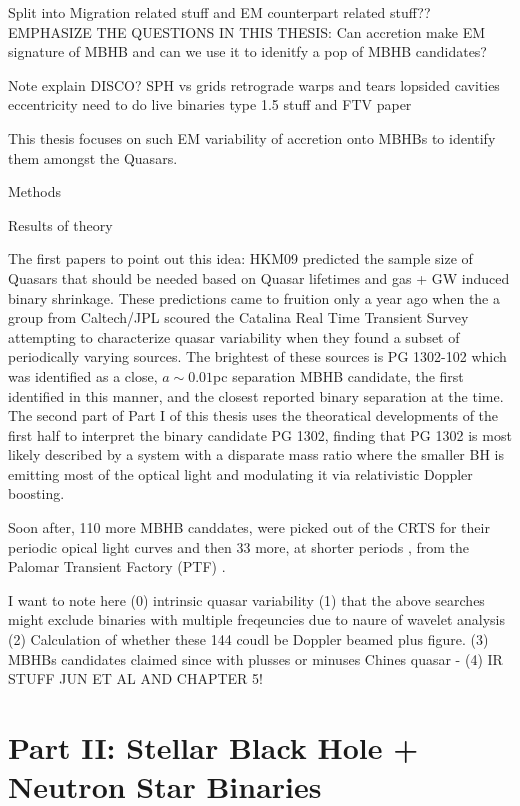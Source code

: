 {Split into Migration related stuff and EM counterpart related stuff??
EMPHASIZE THE QUESTIONS IN THIS THESIS: Can accretion make EM signature of MBHB and can we use it to idenitfy a pop of MBHB candidates?

Note
explain DISCO?
SPH vs grids
retrograde
warps and tears
lopsided cavities
eccentricity
need to do live binaries type 1.5 stuff and FTV paper





This thesis focuses on such EM variability of accretion onto MBHBs to identify
them amongst the Quasars.

Methods

Results of theory

The first papers to point out this idea: HKM09 predicted the sample size of
Quasars that should be needed based on Quasar lifetimes and gas + GW induced
binary shrinkage. These predictions came to fruition only a year ago when the
a group from Caltech/JPL scoured the Catalina Real Time Transient Survey
\citep{CRTS refs} attempting to characterize quasar variability when they
found a subset of periodically varying sources. The brightest of these sources
is PG 1302-102 which was identified as a close, $a \sim 0.01$pc separation
MBHB candidate, the first identified in this manner, and the closest reported
binary separation at the time. The second part of Part I of this thesis uses
the theoratical developments of the first half to interpret the binary
candidate PG 1302, finding that PG 1302 is most likely described by a system
with a disparate mass ratio where the smaller BH is emitting most of the
optical light and modulating it via relativistic Doppler boosting.


Soon after, 110 more MBHB canddates, were picked out of the CRTS for
their periodic opical light curves \citep{Graham:2015b} and then 33 more, at
shorter periods \citep{CharisiMBHBs:2016}, from the Palomar Transient Factory
(PTF) \citep{}.

I want to note here 
(0) intrinsic quasar variability
(1) that the above searches might exclude binaries with multiple freqeuncies due to naure of wavelet analysis
(2) Calculation of whether these 144 coudl be Doppler beamed plus figure.
(3) MBHBs candidates claimed since with plusses or minuses
	Chines quasar - 
(4) IR STUFF JUN ET AL AND CHAPTER 5!






\section{Part II: Stellar Black Hole + Neutron Star Binaries}
%

}
